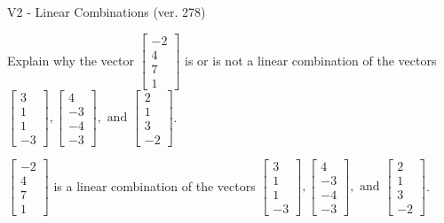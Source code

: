 \begin{exercise}
  \begin{exerciseTitle}V2 - Linear Combinations (ver. 278)\end{exerciseTitle}
  \begin{exerciseStatement}
    Explain why the vector \(\left[\begin{array}{c}
-2 \\
4 \\
7 \\
1
\end{array}\right]\)  is or is not a linear 
	combination of the vectors \(\left[\begin{array}{c}
3 \\
1 \\
1 \\
-3
\end{array}\right] , \left[\begin{array}{c}
4 \\
-3 \\
-4 \\
-3
\end{array}\right] , \text{ and } \left[\begin{array}{c}
2 \\
1 \\
3 \\
-2
\end{array}\right]\).
	


  \end{exerciseStatement}
  \begin{exerciseAnswer}
   \(\left[\begin{array}{c}
-2 \\
4 \\
7 \\
1
\end{array}\right]\) 
  	 is  
	a linear combination of the vectors \(\left[\begin{array}{c}
3 \\
1 \\
1 \\
-3
\end{array}\right] , \left[\begin{array}{c}
4 \\
-3 \\
-4 \\
-3
\end{array}\right] , \text{ and } \left[\begin{array}{c}
2 \\
1 \\
3 \\
-2
\end{array}\right]\).

	
  


  \end{exerciseAnswer}
\end{exercise}